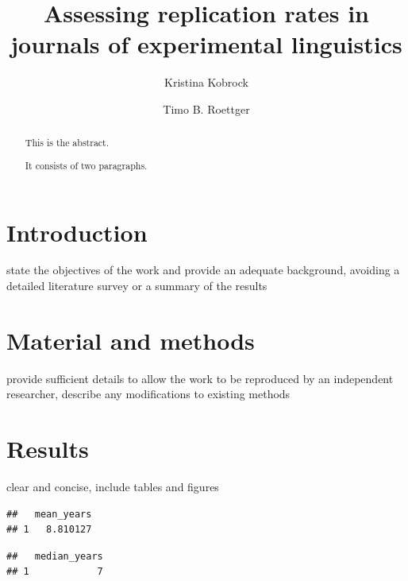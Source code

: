 \documentclass[]{elsarticle} %
\begin{document}
\begin{frontmatter}

  \title{Assessing replication rates in journals of experimental
linguistics}
    \author[University of Osnabrück]{Kristina Kobrock}
    \author[University of Oslo]{Timo B. Roettger}
  
      \address[University of Osnabrück]{Department, Street, City, State,
Zip}
    \address[University of Oslo]{Department, Street, City, State, Zip}
  
  \begin{abstract}
  This is the abstract.

  It consists of two paragraphs.
  \end{abstract}
  
 \end{frontmatter}

\hypertarget{introduction}{%
\section{Introduction}\label{introduction}}

state the objectives of the work and provide an adequate background,
avoiding a detailed literature survey or a summary of the results

\hypertarget{material-and-methods}{%
\section{Material and methods}\label{material-and-methods}}

provide sufficient details to allow the work to be reproduced by an
independent researcher, describe any modifications to existing methods

\hypertarget{results}{%
\section{Results}\label{results}}

clear and concise, include tables and figures

\begin{verbatim}
##   mean_years
## 1   8.810127
\end{verbatim}

\begin{verbatim}
##   median_years
## 1            7
\end{verbatim}
\end{document}
